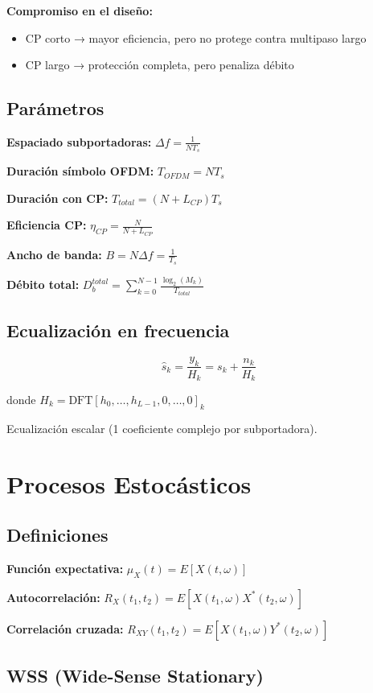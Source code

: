 \documentclass[10pt,a4paper]{article}
\begin{document}
\textbf{Compromiso en el diseño:}
\begin{itemize}
\item CP corto → mayor eficiencia, pero no protege contra multipaso largo
\item CP largo → protección completa, pero penaliza débito
\end{itemize}

\subsection{Parámetros}

\textbf{Espaciado subportadoras:} $\Delta f = \frac{1}{NT_s}$

\textbf{Duración símbolo OFDM:} $T_{OFDM} = NT_s$

\textbf{Duración con CP:} $T_{total} = (N + L_{CP})T_s$

\textbf{Eficiencia CP:} $\eta_{CP} = \frac{N}{N + L_{CP}}$

\textbf{Ancho de banda:} $B = N\Delta f = \frac{1}{T_s}$

\textbf{Débito total:} $D_b^{total} = \sum_{k=0}^{N-1} \frac{\log_2(M_k)}{T_{total}}$

\subsection{Ecualización en frecuencia}

$$\hat{s}_k = \frac{y_k}{H_k} = s_k + \frac{n_k}{H_k}$$

donde $H_k = \text{DFT}[h_0, \ldots, h_{L-1}, 0, \ldots, 0]_k$

Ecualización escalar (1 coeficiente complejo por subportadora).

\section{Procesos Estocásticos}

\subsection{Definiciones}

\textbf{Función expectativa:} $\mu_X(t) = E[X(t,\omega)]$

\textbf{Autocorrelación:} $R_X(t_1,t_2) = E[X(t_1,\omega)X^*(t_2,\omega)]$

\textbf{Correlación cruzada:} $R_{XY}(t_1,t_2) = E[X(t_1,\omega)Y^*(t_2,\omega)]$

\subsection{WSS (Wide-Sense Stationary)}
\end{document}
